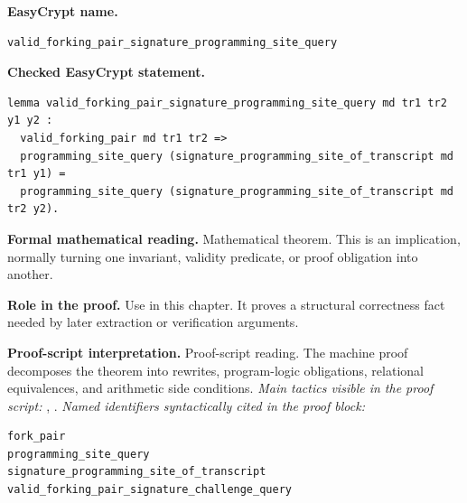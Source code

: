 \begin{formaltheorem}
\noindent\textbf{EasyCrypt name.}
\begin{lstlisting}[language=EasyCrypt,basicstyle=\ttfamily\scriptsize]
valid_forking_pair_signature_programming_site_query
\end{lstlisting}
\noindent\textbf{Checked EasyCrypt statement.}
\begin{lstlisting}[language=EasyCrypt,basicstyle=\ttfamily\scriptsize]
lemma valid_forking_pair_signature_programming_site_query md tr1 tr2 y1 y2 :
  valid_forking_pair md tr1 tr2 =>
  programming_site_query (signature_programming_site_of_transcript md tr1 y1) =
  programming_site_query (signature_programming_site_of_transcript md tr2 y2).
\end{lstlisting}
\noindent\textbf{Formal mathematical reading.}
Mathematical theorem. This is an implication, normally turning one invariant, validity predicate, or proof obligation into another.

\noindent\textbf{Role in the proof.}
Use in this chapter. It proves a structural correctness fact needed by later extraction or verification arguments.

\noindent\textbf{Proof-script interpretation.}
Proof-script reading. The machine proof decomposes the theorem into rewrites, program-logic obligations, relational equivalences, and arithmetic side conditions.
\emph{Main tactics visible in the proof script:} , .
\emph{Named identifiers syntactically cited in the proof block:}
\begin{lstlisting}[language=EasyCrypt,basicstyle=\ttfamily\scriptsize]
fork_pair
programming_site_query
signature_programming_site_of_transcript
valid_forking_pair_signature_challenge_query
\end{lstlisting}

\end{formaltheorem}

